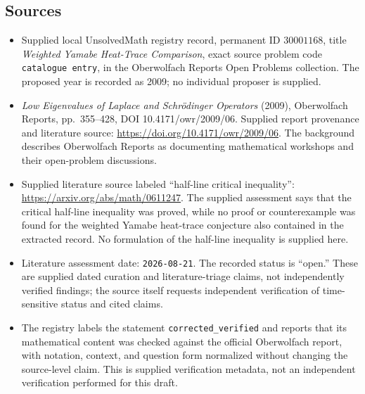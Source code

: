 \documentclass[11pt]{article}
\begin{document}
\subsection{Sources}
\begin{itemize}
\item Supplied local UnsolvedMath registry record, permanent ID \(30001168\), title \emph{Weighted Yamabe Heat-Trace Comparison}, exact source problem code \texttt{catalogue entry}, in the Oberwolfach Reports Open Problems collection. The proposed year is recorded as 2009; no individual proposer is supplied.
\item \emph{Low Eigenvalues of Laplace and Schrödinger Operators} (2009), Oberwolfach Reports, pp.\ 355--428, DOI 10.4171/owr/2009/06. Supplied report provenance and literature source: \url{https://doi.org/10.4171/owr/2009/06}. The background describes Oberwolfach Reports as documenting mathematical workshops and their open-problem discussions.
\item Supplied literature source labeled ``half-line critical inequality'': \url{https://arxiv.org/abs/math/0611247}. The supplied assessment says that the critical half-line inequality was proved, while no proof or counterexample was found for the weighted Yamabe heat-trace conjecture also contained in the extracted record. No formulation of the half-line inequality is supplied here.
\item Literature assessment date: \texttt{2026-08-21}. The recorded status is ``open.'' These are supplied dated curation and literature-triage claims, not independently verified findings; the source itself requests independent verification of time-sensitive status and cited claims.
\item The registry labels the statement \texttt{corrected\_verified} and reports that its mathematical content was checked against the official Oberwolfach report, with notation, context, and question form normalized without changing the source-level claim. This is supplied verification metadata, not an independent verification performed for this draft.
\end{itemize}
\end{document}

